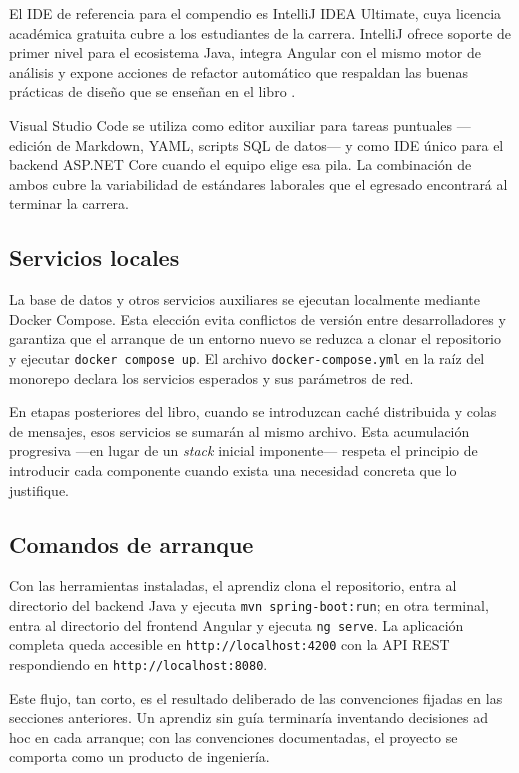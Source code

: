 El IDE de referencia para el compendio es IntelliJ IDEA Ultimate, cuya licencia acad\'emica gratuita cubre a los estudiantes de la carrera. IntelliJ ofrece soporte de primer nivel para el ecosistema Java, integra Angular con el mismo motor de an\'alisis y expone acciones de refactor autom\'atico que respaldan las buenas pr\'acticas de dise\~no que se ense\~nan en el libro \cite{fowler2018refactoring}.

Visual Studio Code se utiliza como editor auxiliar para tareas puntuales ---edici\'on de Markdown, YAML, scripts SQL de datos--- y como IDE \'unico para el backend ASP.NET Core cuando el equipo elige esa pila. La combinaci\'on de ambos cubre la variabilidad de est\'andares laborales que el egresado encontrar\'a al terminar la carrera.

\subsection{Servicios locales}
\label{sec:u0:tools:services}

La base de datos y otros servicios auxiliares se ejecutan localmente mediante Docker Compose. Esta elecci\'on evita conflictos de versi\'on entre desarrolladores y garantiza que el arranque de un entorno nuevo se reduzca a clonar el repositorio y ejecutar \texttt{docker~compose~up}. El archivo \texttt{docker-compose.yml} en la ra\'iz del monorepo declara los servicios esperados y sus par\'ametros de red.

En etapas posteriores del libro, cuando se introduzcan cach\'e distribuida y colas de mensajes, esos servicios se sumar\'an al mismo archivo. Esta acumulaci\'on progresiva ---en lugar de un \emph{stack} inicial imponente--- respeta el principio de introducir cada componente cuando exista una necesidad concreta que lo justifique.

\subsection{Comandos de arranque}
\label{sec:u0:tools:cmd}

Con las herramientas instaladas, el aprendiz clona el repositorio, entra al directorio del backend Java y ejecuta \texttt{mvn~spring-boot:run}; en otra terminal, entra al directorio del frontend Angular y ejecuta \texttt{ng~serve}. La aplicaci\'on completa queda accesible en \texttt{http://localhost:4200} con la API REST respondiendo en \texttt{http://localhost:8080}.

Este flujo, tan corto, es el resultado deliberado de las convenciones fijadas en las secciones anteriores. Un aprendiz sin gu\'ia terminar\'ia inventando decisiones ad hoc en cada arranque; con las convenciones documentadas, el proyecto se comporta como un producto de ingenier\'ia.

